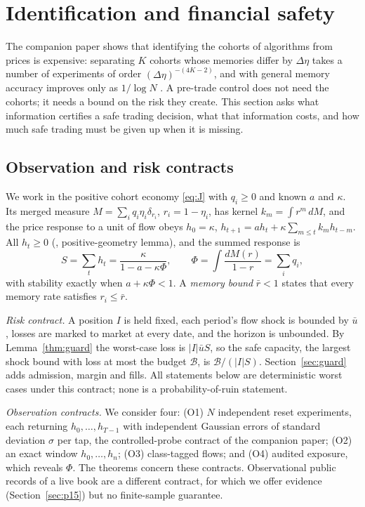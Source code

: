 \documentclass[12pt]{article}
\theoremstyle{definition}
\theoremstyle{remark}
\begin{document}
\section{Identification and financial safety}\label{sec:infosafety}

The companion paper shows that identifying the cohorts of algorithms from prices is expensive: separating $K$ cohorts whose memories differ by $\Delta\eta$ takes a number of experiments of order $(\Delta\eta)^{-(4K-2)}$, and with general memory accuracy improves only as $1/\log N$ \citep{niroula2026}. A pre-trade control does not need the cohorts; it needs a bound on the risk they create. This section asks what information certifies a safe trading decision, what that information costs, and how much safe trading must be given up when it is missing.

\subsection{Observation and risk contracts}\label{sec:contracts}
We work in the positive cohort economy \eqref{eq:J} with $q_i\ge0$ and known $a$ and $\kappa$. Its merged measure $M=\sum_iq_i\eta_i\delta_{r_i}$, $r_i=1-\eta_i$, has kernel $k_m=\int r^m\,dM$, and the price response to a unit of flow obeys $h_0=\kappa$, $h_{t+1}=ah_t+\kappa\sum_{m\le t}k_mh_{t-m}$. All $h_t\ge0$ (\citealp{niroula2026}, positive-geometry lemma), and the summed response is
\begin{equation}\label{eq:SPhi}
S=\sum_th_t=\frac{\kappa}{1-a-\kappa\Phi},\qquad \Phi=\int\frac{dM(r)}{1-r}=\sum_iq_i ,
\end{equation}
with stability exactly when $a+\kappa\Phi<1$. A \emph{memory bound} $\bar r<1$ states that every memory rate satisfies $r_i\le\bar r$.

\emph{Risk contract.} A position $I$ is held fixed, each period's flow shock is bounded by $\bar u$, losses are marked to market at every date, and the horizon is unbounded. By Lemma~\ref{thm:guard} the worst-case loss is $|I|\bar uS$, so the safe capacity, the largest shock bound with loss at most the budget $\mathcal B$, is $\mathcal B/(|I|S)$. Section~\ref{sec:guard} adds admission, margin and fills. All statements below are deterministic worst cases under this contract; none is a probability-of-ruin statement.

\emph{Observation contracts.} We consider four: (O1) $N$ independent reset experiments, each returning $h_0,\ldots,h_{T-1}$ with independent Gaussian errors of standard deviation $\sigma$ per tap, the controlled-probe contract of the companion paper; (O2) an exact window $h_0,\ldots,h_n$; (O3) class-tagged flows; and (O4) audited exposure, which reveals $\Phi$. The theorems concern these contracts. Observational public records of a live book are a different contract, for which we offer evidence (Section~\ref{sec:p15}) but no finite-sample guarantee.
\end{document}

